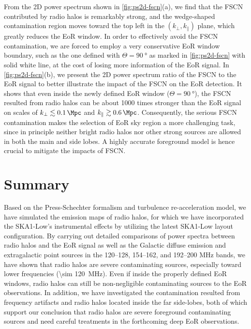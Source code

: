 \documentclass[modern]{aastex62}
\newcommand{\klos}{\text{$k_{\parallel}$}}
\newcommand{\kperp}{\text{$k_{\bot}$}}
\begin{document}
From the 2D power spectrum shown in \autoref{fig:ps2d-fscn}(a),
we find that the FSCN contributed by radio halos is remarkably strong,
and the wedge-shaped contamination region moves toward the top left in
the $(\kperp, \klos)$ plane, which greatly reduces the EoR window.
In order to effectively avoid the FSCN contamination, we are forced to
employ a very conservative EoR window boundary, such as the one defined
with $\Theta = \SI{90}{\degree}$ as marked in \autoref{fig:ps2d-fscn}
with solid white line, at the cost of losing more information of the EoR
signal.
In \autoref{fig:ps2d-fscn}(b), we present the 2D power spectrum ratio
of the FSCN to the EoR signal to better illustrate the impact of the
FSCN on the EoR detection.
It shows that even inside the newly defined EoR window
($\Theta = \SI{90}{\degree}$), the FSCN resulted from radio halos can
be about 1000 times stronger than the EoR signal on scales of
$\kperp \lesssim \SI{0.1}{\per\Mpc}$ and $\klos \gtrsim \SI{0.6}{\per\Mpc}$.
Consequently,
the serious FSCN contamination makes the selection of EoR sky region
a more challenging task, since in principle neither bright radio halos
nor other strong sources are allowed in both the main and side lobes.
A highly accurate foreground model is hence crucial to mitigate the
impacts of FSCN.


\section{Summary}
\label{sec:summary}

Based on the Press-Schechter formalism and turbulence re-acceleration
model, we have simulated the emission maps of radio halos, for which we
have incorporated the SKA1-Low's instrumental effects by utilizing the
latest SKA1-Low layout configuration.
By carrying out detailed comparisons of power spectra between radio halos
and the EoR signal as well as the Galactic diffuse emission and
extragalactic point sources in the \numrange{120}{128},
\numrange{154}{162}, and \numrange{192}{200} \si{\MHz} bands,
we have shown that radio halos are severe contaminating sources,
especially toward lower frequencies (\SI{\sim 120}{\MHz}).
Even if inside the properly defined EoR windows, radio halos can still
be non-negligible contaminating sources to the EoR observations.
In addition, we have investigated the contamination resulted from
frequency artifacts and radio halos located inside the far side-lobes,
both of which support our conclusion that radio halos are severe
foreground contaminating sources and need careful treatments in the
forthcoming deep EoR observations.
\end{document}
